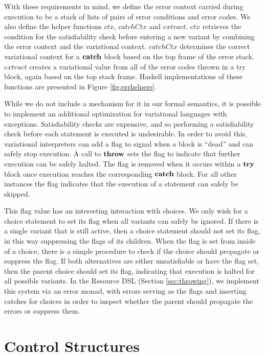 \documentclass[12pt,oneside]{book}
\begin{document}
With these requirements in mind, we define the error context carried during execution to be a stack of lists of pairs of error conditions and error codes.
We also define the helper functions $\mathit{ctx}$, $\mathit{catchCtx}$ and $\mathit{extract}$. $\mathit{ctx}$ retrieves the condition for the satisfiability check
before entering a new variant by combining the error context and the variational context. $\mathit{catchCtx}$ determines the correct variational context for a $\textbf{\textup{\textrm{catch}}}$
block based on the top frame of the error stack. $\mathit{extract}$ creates a variational value from all of the error codes thrown in a try block, again based on the top stack frame. Haskell implementations of these functions are presented in Figure \ref{fig:errhelpers}.

While we do not include a mechanism for it in our formal semantics, it is possible to implement an additional optimization for variational languages with exceptions.
Satisfiability checks are expensive, and so performing a satisfiability check before each statement is executed is undesirable. In order to avoid this, variational interpreters
can add a flag to signal when a block is ``dead'' and can safely stop execution. A call to $\textbf{\textup{\textrm{throw}}}$ sets the flag to indicate that further execution can be safely halted.
The flag is removed when it occurs within a $\textbf{\textup{\textrm{try}}}$ block once execution reaches the corresponding $\textbf{\textup{\textrm{catch}}}$ block. For all other instances the flag indicates that
the execution of a statement can safely be skipped.

This flag value has an interesting interaction with choices. We only wish for a choice statement to set its flag when all variants can safely be ignored. If there is a single variant that is still active, then a choice statement should not set its flag, in this way suppressing the flags of its children. When the flag is set from inside of
a choice, there is a simple procedure to check if the choice should propagate or suppress the flag. If both alternatives are either unsatisfiable or have the flag set, then
the parent choice should set its flag, indicating that execution is halted for all possible variants. In the Resource DSL (Section \ref{sec:throwing}), we implement this system via an error monad,
with errors serving as the flags and inserting catches for choices in order to inspect whether the parent should propagate the errors or suppress them.

\section{Control Structures}
\label{sec:control}
\end{document}
